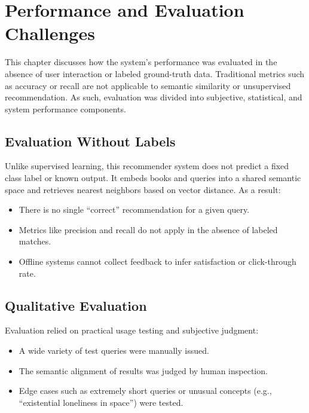 \chapter{Performance and Evaluation Challenges}
\label{chapter:performance}

This chapter discusses how the system's performance was evaluated in the absence of user interaction or labeled ground-truth data. Traditional metrics such as accuracy or recall are not applicable to semantic similarity or unsupervised recommendation. As such, evaluation was divided into subjective, statistical, and system performance components.

\section{Evaluation Without Labels}
\label{sec:no-labels}

Unlike supervised learning, this recommender system does not predict a fixed class label or known output. It embeds books and queries into a shared semantic space and retrieves nearest neighbors based on vector distance. As a result:

\begin{itemize}
    \item There is no single “correct” recommendation for a given query.
    \item Metrics like precision and recall do not apply in the absence of labeled matches.
    \item Offline systems cannot collect feedback to infer satisfaction or click-through rate.
\end{itemize}

\section{Qualitative Evaluation}
\label{sec:qualitative-eval}

Evaluation relied on practical usage testing and subjective judgment:

\begin{itemize}
    \item A wide variety of test queries were manually issued.
    \item The semantic alignment of results was judged by human inspection.
    \item Edge cases such as extremely short queries or unusual concepts (e.g., “existential loneliness in space”) were tested.
\end{itemize}

